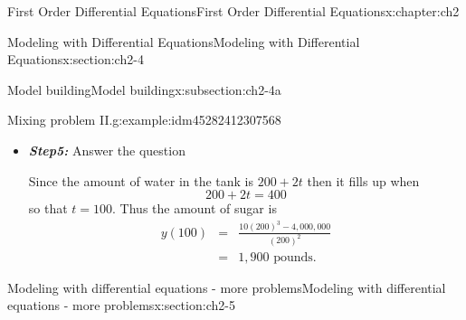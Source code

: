 \documentclass[oneside,10pt,]{book}
\newcommand{\alert}[1]{\textbf{\textit{#1}}}
\numberwithin{equation}{section}
\numberwithin{equation}{section}
\newcommand{\amp}{&}
\begin{document}
\begin{chapterptx}{First Order Differential Equations}{}{First Order Differential Equations}{}{}{x:chapter:ch2}
\begin{sectionptx}{Modeling with Differential Equations}{}{Modeling with Differential Equations}{}{}{x:section:ch2-4}
\begin{subsectionptx}{Model building}{}{Model building}{}{}{x:subsection:ch2-4a}
\begin{example}{Mixing problem II.}{g:example:idm45282412307568}
\begin{itemize}[label=\textbullet]
\begin{equation*}
\mu(t)=e^{4\int\frac{dt}{200+2t}}=e^{2\int\frac{dt}{100+t}}=e^{2\ln\left(100+t\right)}=\left(100+t\right)^{2}.
\end{equation*}
Thus using the formula, we have that%
\begin{align*}
y(t) \amp = \amp \frac{1}{\mu(t)}\left[\int\mu(t)b(t)dt.+C\right]\\
\amp = \amp \frac{1}{\left(100+t\right)^{2}}\left[30\int\left(100+t\right)^{2}dt.+C\right]\\
\amp = \amp \frac{1}{\left(100+t\right)^{2}}\left[30\frac{\left(100+t\right)^{3}}{3}.+C\right]\\
\amp = \amp \frac{1}{\left(100+t\right)^{2}}\left[10\left(100+t\right)^{3}+C\right]
\end{align*}
and using \(y(0)=600\) we get that%
\begin{equation*}
600=\frac{1}{100^{2}}\left[10\cdot100^{3}+C\right]
\end{equation*}
so that%
\begin{equation*}
C=-4,000,000
\end{equation*}
and thus%
\begin{equation*}
y(t)=\frac{10\left(100+t\right)^{3}-4,000,000}{\left(100+t\right)^{2}}.
\end{equation*}
%
\item{}\alert{Step5:} Answer the question%
\par
Since the amount of water in the tank is \(200+2t\) then it fills up when%
\begin{equation*}
200+2t=400
\end{equation*}
so that \(t=100\). Thus the amount of sugar is%
\begin{align*}
y(100) \amp = \amp \frac{10\left(200\right)^{3}-4,000,000}{\left(200\right)^{2}}\\
\amp = \amp 1,900\mbox{ pounds}.
\end{align*}
%
\end{itemize}
\end{example}
\end{subsectionptx}
\end{sectionptx}
%
%
\typeout{************************************************}
\typeout{************************************************}
%
\begin{sectionptx}{Modeling with differential equations - more problems}{}{Modeling with differential equations - more problems}{}{}{x:section:ch2-5}

\end{sectionptx}
\end{chapterptx}
\end{document}
